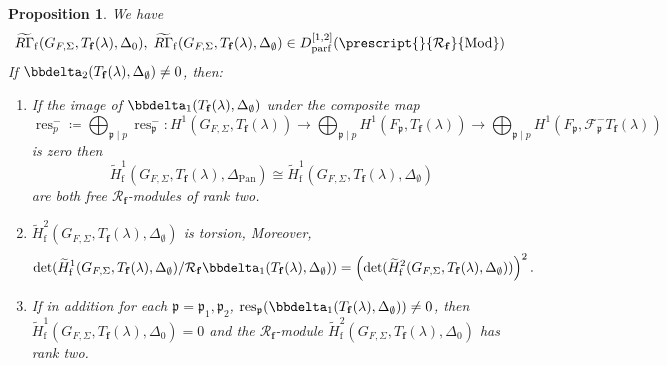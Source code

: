 \documentclass[10pt]{amsart}
\numberwithin{equation}{section}
\newtheorem{conj}{Conjecture}
\newtheorem{prop}[thm]{Proposition}
\theoremstyle{definition}
\theoremstyle{remark} %
\newcommand{\Log}{\operatorname{Log}}
\newcommand{\pan}{\mathrm{Pan}}
\DeclareMathOperator{\res}{res}
\newcommand{\f}{\mathbf{f}}
\newcommand{\scrF}{\mathscr{F}}
\newcommand{\p}{\mathfrak{p}}
\newcommand{\R}{\mathcal{R}}
\begin{document}
		\begin{prop} 
			\label{7.2}
			We have
			$$\widetilde{R\Gamma}_{\mathrm{f}}(G_{F,\Sigma},T_\f(\lambda), \Delta_0), \; \widetilde{R\Gamma}_{\mathrm{f}}(G_{F,\Sigma},T_\f(\lambda), \Delta_\emptyset) \in D_{\mathrm{parf}}^{[1,2]}(\prescript{}{\R_\f}{\mathrm{Mod}})$$
			If $\bbdelta_2(T_\f(\lambda), \Delta_\emptyset) \neq 0$, then:
			\begin{enumerate}
				\item If the image of $\bbdelta_1(T_\f(\lambda), \Delta_\emptyset)$ under the composite map 
				$$ \res^-_p\coloneqq \bigoplus_{\p \mid p} \res_{\p}^-  \colon H^1(G_{F, \Sigma}, T_\f(\lambda)) \rightarrow \bigoplus_{\p \mid p} H^1(F_{\p}, T_\f(\lambda)) \rightarrow \bigoplus_{\p \mid p} H^1(F_{\p}, \scrF^-_{\p} T_\f(\lambda)) $$ is zero then $$ \widetilde{H}^1_{\mathrm{f}}(G_{F,\Sigma},T_\f(\lambda),\Delta_{\pan}) \cong \widetilde{H}^1_{\mathrm{f}}(G_{F,\Sigma},T_\f(\lambda),\Delta_\emptyset) $$ are both free $ \R_{\f} $-modules of rank two. 
				\item $\widetilde{H}^2_{\mathrm{f}}(G_{F,\Sigma},T_\f(\lambda),\Delta_\emptyset)$ is torsion, Moreover,
				\begin{equation*}
					\det(\widetilde{H}^1_{\mathrm{f}}(G_{F,\Sigma},T_\f(\lambda),\Delta_\emptyset)/\R_{\f}\bbdelta_1(T_\f(\lambda), \Delta_\emptyset)) = \left( \det(\widetilde{H}^2_{\mathrm{f}}(G_{F,\Sigma},T_\f(\lambda),\Delta_\emptyset))\right)^2 .
				\end{equation*}
				\item If in addition for each $ \p = \p_1,\p_2 $, $ \res_{\p}(\bbdelta_1(T_\f(\lambda), \Delta_{\emptyset})) \ne 0 $, then $ \widetilde{H}^1_{\mathrm{f}}(G_{F,\Sigma},T_\f(\lambda),\Delta_{0}) = 0 $ and the $ \R_{\f} $-module $  \widetilde{H}^2_{\mathrm{f}}(G_{F,\Sigma},T_\f(\lambda),\Delta_{0}) $ has rank two.
			\end{enumerate}
		\end{prop}
\end{document}
